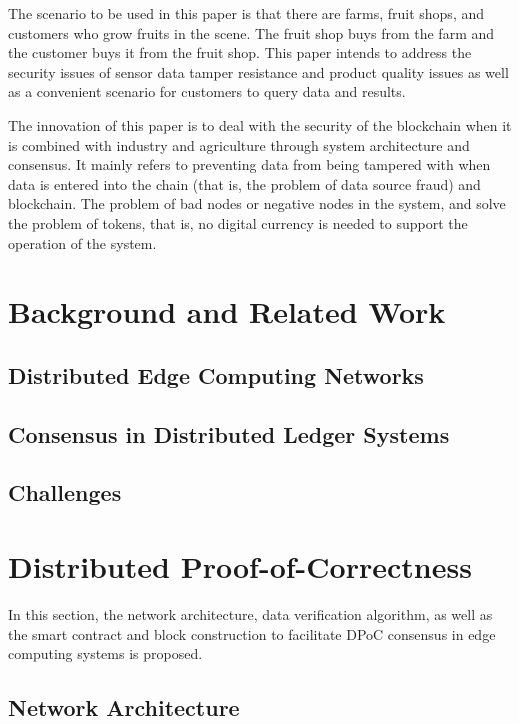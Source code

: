 \documentclass{ieeeaccess}
\begin{document}
The scenario to be used in this paper is that there are farms, fruit shops, and customers who grow fruits in the scene. The fruit shop buys from the farm and the customer buys it from the fruit shop. This paper intends to address the security issues of sensor data tamper resistance and product quality issues as well as a convenient scenario for customers to query data and results.

The innovation of this paper is to deal with the security of the blockchain when it is combined with industry and agriculture through system architecture and consensus. It mainly refers to preventing data from being tampered with when data is entered into the chain (that is, the problem of data source fraud) and blockchain. The problem of bad nodes or negative nodes in the system, and solve the problem of tokens, that is, no digital currency is needed to support the operation of the system.

\section{Background and Related Work}

\subsection{Distributed Edge Computing Networks}

\subsection{Consensus in Distributed Ledger Systems}

\subsection{Challenges}

\section{Distributed Proof-of-Correctness}

In this section, the network architecture, data verification algorithm, as well as the smart contract and block construction to facilitate DPoC consensus in edge computing systems is proposed.

\subsection{Network Architecture}
\end{document}
